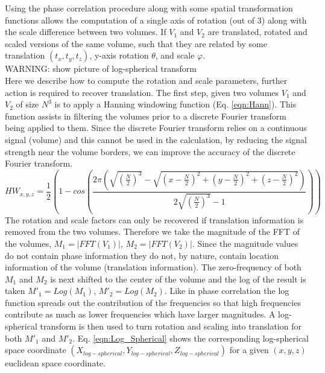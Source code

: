Using the phase correlation procedure along with some spatial transformation functions allows the computation of a single axis of rotation (out of 3) along with the scale difference between two volumes. If $V_1$ and $V_2$ are translated, rotated and scaled versions of the same volume, such that they are related by some translation $(t_x, t_y, t_z)$, y-axis rotation $\theta$, and scale $\varphi$.\\


WARNING: show picture of log-spherical transform\\

Here we describe how to compute the rotation and scale parameters, further action is required to recover translation. The first step, given two volumes $V_1$ and $V_2$ of size $N^3$ is to apply a Hanning windowing function (Eq. \ref{eqn:Hann}). This function assists in filtering the volumes prior to a discrete Fourier transform being applied to them. Since the discrete Fourier transform relies on a continuous signal (volume) and this cannot be used in the calculation, by reducing the signal strength near the volume borders, we can improve the accuracy of the discrete Fourier transform.
\begin{equation} \label{eqn:Hann}
\scriptstyle
HW_{x,y,z} = \frac{1}{2}\left(
1 - cos \left(
\frac{2\pi
\left(
\sqrt{\left(\frac{N}{2}\right)^3} -
\sqrt{
\left(x-\frac{N}{2}\right)^2 + \left(y-\frac{N}{2}\right)^2 + \left(z-\frac{N}{2}\right)^2
}
\right)
}
{2\sqrt{\left(\frac{N}{2}\right)^3} - 1}
\right)
\right)
\end{equation}
The rotation and scale factors can only be recovered if translation information is removed from the two volumes. Therefore we take the magnitude of the FFT of the volumes, $M_1 = |FFT(V_1)|$, $M_2 = |FFT(V_2)|$. Since the magnitude values do not contain phase information they do not, by nature, contain location information of the volume (translation information). The zero-frequency of both $M_1$ and $M_2$ is next shifted to the center of the volume and the log of the result is taken $M'_1 = Log(M_1)$, $M'_2 = Log(M_2)$. Like in phase correlation the log function spreads out the contribution of the frequencies so that high frequencies contribute as much as lower frequencies which have larger magnitudes. A log-spherical transform is then used to turn rotation and scaling into translation for both $M'_1$ and $M'_2$. Eq. \ref{eqn:Log_Spherical} shows the corresponding log-spherical space coordinate $(X_{log-spherical}, Y_{log-spherical}, Z_{log-spherical})$ for a given $(x,y,z)$ euclidean space coordinate.
